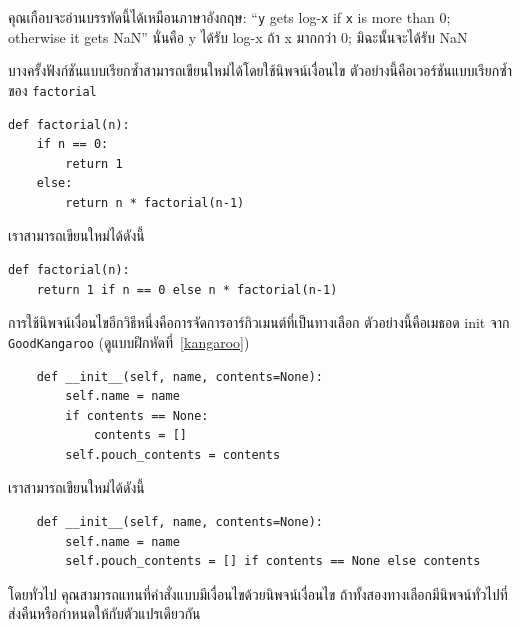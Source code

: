 คุณเกือบจะอ่านบรรทัดนี้ได้เหมือนภาษาอังกฤษ: ``{\tt y} gets log-{\tt x} if {\tt x} is more than 0; 
otherwise it gets NaN'' นั่นคือ y ได้รับ log-x ถ้า x มากกว่า 0; มิฉะนั้นจะได้รับ NaN 


บางครั้งฟังก์ชันแบบเรียกซ้ำสามารถเขียนใหม่ได้โดยใช้นิพจน์เงื่อนไข ตัวอย่างนี้คือเวอร์ชันแบบเรียกซ้ำของ {\tt factorial}

\begin{verbatim}
def factorial(n):
    if n == 0:
        return 1
    else:
        return n * factorial(n-1)
\end{verbatim}

เราสามารถเขียนใหม่ได้ดังนี้

\begin{verbatim}
def factorial(n):
    return 1 if n == 0 else n * factorial(n-1)
\end{verbatim}

การใช้นิพจน์เงื่อนไขอีกวิธีหนึ่งคือการจัดการอาร์กิวเมนต์ที่เป็นทางเลือก ตัวอย่างนี้คือเมธอด init จาก {\tt GoodKangaroo} (ดูแบบฝึกหัดที่~\ref{kangaroo})

\begin{verbatim}
    def __init__(self, name, contents=None):
        self.name = name
        if contents == None:
            contents = []
        self.pouch_contents = contents
\end{verbatim}

เราสามารถเขียนใหม่ได้ดังนี้

\begin{verbatim}
    def __init__(self, name, contents=None):
        self.name = name
        self.pouch_contents = [] if contents == None else contents 
\end{verbatim}

โดยทั่วไป คุณสามารถแทนที่คำสั่งแบบมีเงื่อนไขด้วยนิพจน์เงื่อนไข ถ้าทั้งสองทางเลือกมีนิพจน์ทั่วไปที่ส่งคืนหรือกำหนดให้กับตัวแปรเดียวกัน




